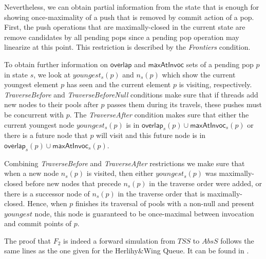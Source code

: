 Nevertheless, we can obtain partial information from the state that is enough for showing once-maximality of a push that is removed by commit action of a pop. First, the push operations that are maximally-closed in the current state are remove candidates by all pending pops since a pending pop operation may linearize at this point. This restriction is described by the \emph{Frontiers} condition. 

To obtain further information on $\mathsf{overlap}$ and $\mathsf{maxAtInvoc}$ sets of a pending pop $p$ in state $s$, we look at $youngest_s(p)$ and $n_s(p)$ which show the current youngest element $p$ has seen and the current element $p$ is visiting, respectively. \emph{TraverseBefore} and \emph{TraverseBeforeNull} conditions make sure that if threads add new nodes to their pools after $p$ passes them during its travels, these pushes must be concurrent with $p$. The \emph{TraverseAfter} condition makes sure that either the current youngest node $youngest_s(p)$ is in $\mathsf{overlap}_s(p) \cup \mathsf{maxAtInvoc}_s(p)$ or there is a future node that $p$ will visit and this future node is in $\mathsf{overlap}_s(p) \cup \mathsf{maxAtInvoc}_s(p)$. 

Combining \emph{TraverseBefore} and \emph{TraverseAfter} restrictions we make sure that when a new node $n_s(p)$ is visited, then either $youngest_s(p)$ was maximally-closed before new nodes that precede $n_s(p)$ in the traverse order were added, or there is a successor node of $n_s(p)$ in the traverse order that is maximally-closed. Hence, when $p$ finishes its traversal of pools with a non-null and present $youngest$ node, this node is guaranteed to be once-maximal between invocation and commit points of $p$.

The proof that $F_2$ is indeed a forward simulation from $\mathit{TSS}$ to $AbsS$ follows the same lines as the one given for the Herlihy\&Wing Queue. It can be found in \cite{extended}.

